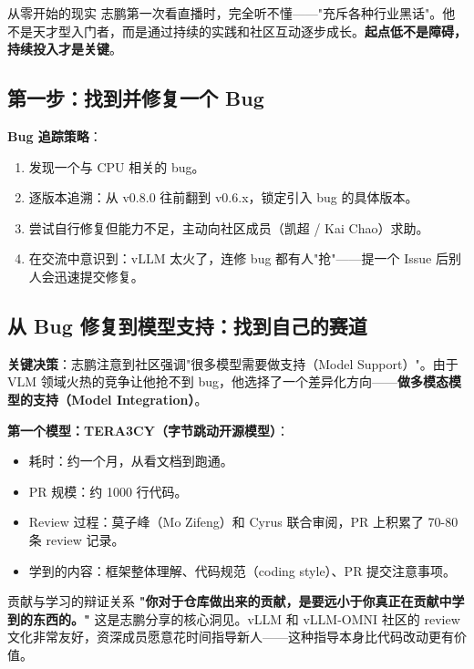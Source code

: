 \documentclass[a4paper]{article}
\begin{document}
\begin{warningbox}{从零开始的现实}
志鹏第一次看直播时，完全听不懂——"充斥各种行业黑话"。他不是天才型入门者，而是通过持续的实践和社区互动逐步成长。\textbf{起点低不是障碍，持续投入才是关键}。
\end{warningbox}

\subsection{第一步：找到并修复一个 Bug}

\textbf{Bug 追踪策略}：

\begin{enumerate}
\item 发现一个与 CPU 相关的 bug。
\item 逐版本追溯：从 v0.8.0 往前翻到 v0.6.x，锁定引入 bug 的具体版本。
\item 尝试自行修复但能力不足，主动向社区成员（凯超 / Kai Chao）求助。
\item 在交流中意识到：vLLM 太火了，连修 bug 都有人"抢"——提一个 Issue 后别人会迅速提交修复。
\end{enumerate}

\subsection{从 Bug 修复到模型支持：找到自己的赛道}

\textbf{关键决策}：志鹏注意到社区强调"很多模型需要做支持（Model Support）"。由于 VLM 领域火热的竞争让他抢不到 bug，他选择了一个差异化方向——\textbf{做多模态模型的支持（Model Integration）}。

\textbf{第一个模型：TERA3CY（字节跳动开源模型）}：

\begin{itemize}
\item 耗时：约一个月，从看文档到跑通。
\item PR 规模：约 1000 行代码。
\item Review 过程：莫子峰（Mo Zifeng）和 Cyrus 联合审阅，PR 上积累了 70-80 条 review 记录。
\item 学到的内容：框架整体理解、代码规范（coding style）、PR 提交注意事项。
\end{itemize}

\begin{importantbox}{贡献与学习的辩证关系}
\textbf{"你对于仓库做出来的贡献，是要远小于你真正在贡献中学到的东西的。"} 这是志鹏分享的核心洞见。vLLM 和 vLLM-OMNI 社区的 review 文化非常友好，资深成员愿意花时间指导新人——这种指导本身比代码改动更有价值。
\end{importantbox}
\end{document}
